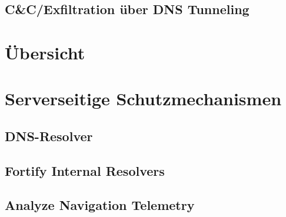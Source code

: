 
\subsection{C&C/Exfiltration über DNS Tunneling}


\section{Übersicht}
\label{BedrohungenÜbersicht}





\section{Serverseitige Schutzmechanismen}

\subsection{DNS-Resolver}


\subsection{Fortify Internal Resolvers}

\subsection{Analyze Navigation Telemetry}

